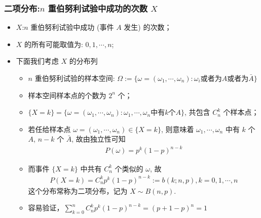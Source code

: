 \documentclass[Prob-All.tex]{subfiles}
\begin{document}
\begin{frame}
	\frametitle{二项分布:$n$ 重伯努利试验中成功的次数 $X$}
	\begin{itemize}[<+-|alert@+>]
		\item $X$:$n$ 重伯努利试验中成功 (事件 $A$ 发生) 的次数；
		\item $X$ 的所有可能取值为: $0, 1, \cdots, n$;
		\item 下面我们考虑 $X$ 的分布列
		      \begin{itemize}
			      \item $n$ 重伯努利试验的样本空间: $\Omega:=\{\omega=(\omega_1,\cdots,\omega_n):\omega_i\mbox{或者为} A\mbox{或者为}\bar{A}\}$
			      \item 样本空间样本点的个数为 $2^n$ 个；
			      \item $\{X=k\}=\{\omega=(\omega_1,\cdots,\omega_n):\omega_1,\cdots,\omega_n\mbox{中有} k\mbox{个} A\}$, 共包含 $C_n^k$ 个样本点；
			      \item 若任给样本点 $\omega=(\omega_1,\cdots,\omega_n)\in \{X=k\}$, 则意味着 $\omega_1,\cdots,\omega_n$ 中有 $k$ 个 $A$, $n-k$ 个 $\bar{A}$, 故由独立性可知
			            \begin{eqnarray*}
				            P(\omega)=p^k(1-p)^{n-k}
			            \end{eqnarray*}
			      \item 而事件 $\{X=k\}$ 中共有 $C_n^k$ 个类似的 $\omega$, 故
			            \begin{eqnarray*}
				            P(X=k)=C_n^kp^k(1-p)^{n-k}:=b(k;n,p), k=0,1,\cdots, n
			            \end{eqnarray*}
			            这个分布常称为二项分布，记为 $X\sim B (n,p)$.
			      \item 容易验证，$\sum_{k=0}^nC_n^kp^k (1-p)^{n-k}=(p+1-p)^n=1$
		      \end{itemize}
	\end{itemize}

\end{frame}
\end{document}
